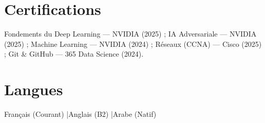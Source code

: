 \documentclass[a4paper,9pt]{article}
\begin{document}
\section{Certifications}
Fondements du Deep Learning --- NVIDIA (2025) ; IA Adversariale --- NVIDIA (2025) ; Machine Learning --- NVIDIA (2024) ; Réseaux (CCNA) --- Cisco (2025) ; Git \& GitHub --- 365 Data Science (2024).
\section{Langues}
Français (Courant) \quad|\quad Anglais (B2) \quad|\quad Arabe (Natif)
\end{document}
